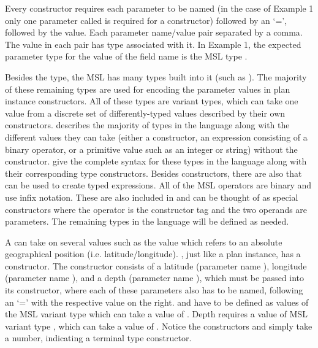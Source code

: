 Every constructor requires each parameter to be named (in the case of Example 1 only one parameter called  is required for a  constructor) followed by an `=', followed by the value. Each parameter name/value pair separated by a comma. The value in each pair has type associated with it. In Example 1, the expected parameter type for the value of the field name  is the MSL type . 

Besides the  type, the MSL has many types built into it (such as ). The majority of these remaining types are used for encoding the parameter values in plan instance constructors. All of these types are variant types, which can take one value from a discrete set of differently-typed values described by their own constructors.  describes the majority of types in the language along with the different values they can take (either a constructor, an expression consisting of a binary operator, or a primitive value such as an integer or string) without the constructor.  give the complete syntax for these types in the language along with their corresponding type constructors. Besides constructors, there are also  that can be used to create typed expressions. All of the MSL operators are binary and use infix notation. These are also included in  and can be thought of as special constructors where the operator is the constructor tag and the two operands are parameters. The remaining types in the language will be defined as needed.

A  can take on several values such as the value  which refers to an absolute geographical position (i.e. latitude/longitude). , just like a plan instance, has a constructor. The  constructor consists of a latitude (parameter name ), longitude (parameter name ), and a depth (parameter name ), which must be passed into its constructor, where each of these parameters also has to be named, following an `=' with the respective value on the right.  and  have to be defined as values of the MSL variant type  which can take a value of . Depth requires a value of MSL variant type , which can take a value of . Notice the constructors  and  simply take a number, indicating a terminal type constructor. 

